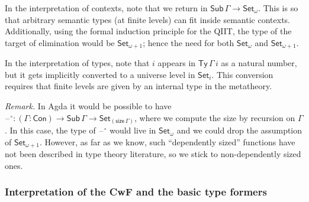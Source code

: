 \documentclass[acmsmall,screen,review]{acmart}
\newcommand{\msf}[1]{{\mathsf{#1}}}
\newcommand{\Set}{\msf{Set}}
\newcommand{\blank}{{\mathord{\hspace{1pt}\text{--}\hspace{1pt}}}}
\newcommand{\Con}{\msf{Con}}
\newcommand{\Sub}{\msf{Sub}}
\newcommand{\Ty}{\msf{Ty}}
\newcommand{\w}{\circ}
\begin{document}
In the interpretation of contexts, note that we return in $\Sub\,\Gamma \to \Set_\omega$. This is so
that arbitrary semantic types (at finite levels) can fit inside semantic contexts. Additionally,
using the formal induction principle for the QIIT, the type of the target of elimination would be
$\Set_{\omega+1}$; hence the need for both $\Set_\omega$ and $\Set_{\omega+1}$.

In the interpretation of types, note that $i$ appears in $\Ty\,\Gamma\,i$ as a natural number,
but it gets implicitly converted to a universe level in $\Set_i$. This conversion requires that
finite levels are given by an internal type in the metatheory.

\emph{Remark.} In Agda it would be possible to have $\blank^\w : (\Gamma : \Con) \to \Sub\,\Gamma
\to \Set_{(\msf{size}\,\Gamma)}$, where we compute the size by recursion on $\Gamma$. In this case,
the type of $\blank^\w$ would live in $\Set_\omega$ and we could drop the assumption of
$\Set_{\omega+1}$. However, as far as we know, such ``dependently sized'' functions have not been
described in type theory literature, so we stick to non-dependently sized ones.

\subsubsection{Interpretation of the CwF and the basic type formers}\label{sec:cwf-pred}
\end{document}
